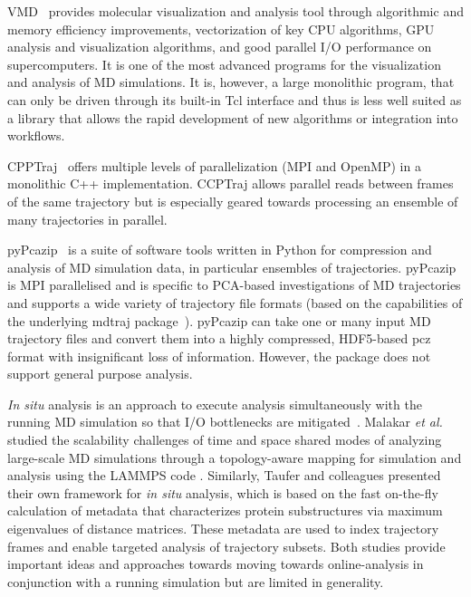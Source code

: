 VMD~\cite{Hum96, VMD2013} provides molecular visualization and analysis tool through algorithmic and memory efficiency improvements, vectorization of key CPU algorithms, GPU analysis and visualization algorithms, and good parallel I/O performance on supercomputers. It is one of the most advanced programs for the visualization and analysis of MD simulations. It is, however, a large monolithic program, that can only be driven through its built-in Tcl interface and thus is less well suited as a library that allows the rapid development of new algorithms or integration into workflows.

CPPTraj~\cite{cpptraj-2013} offers multiple levels of parallelization (MPI and OpenMP) in a monolithic C++ implementation.
CCPTraj allows parallel reads between frames of the same trajectory but is especially geared towards processing an ensemble of many trajectories in parallel.

pyPcazip~\cite{pyPcazip} is a suite of software tools written in Python for compression and analysis of MD simulation data, in particular ensembles of trajectories. 
pyPcazip is MPI parallelised and is specific to PCA-based investigations of MD trajectories and supports a wide variety of trajectory file formats (based on the capabilities of the underlying mdtraj package~\cite{mdtraj-2015}).
pyPcazip can take one or many input MD trajectory files and convert them into a highly compressed, HDF5-based pcz format with insignificant loss of information.
However, the package does not support general purpose analysis.

\textit{In situ} analysis is an approach to execute analysis simultaneously with the running MD simulation so that I/O bottlenecks are  mitigated~\cite{Malakar-etal, Johnston:2017aa}.
Malakar \textit{et al.} studied the scalability challenges of time and space shared modes of analyzing large-scale MD simulations through a topology-aware mapping for simulation and analysis using the LAMMPS code \cite{Malakar-etal}.
Similarly, Taufer and colleagues \cite{Johnston:2017aa} presented their own framework for \textit{in situ} analysis, which is based on the fast on-the-fly calculation of metadata that characterizes protein substructures via maximum eigenvalues of distance matrices.
These metadata are used to index trajectory frames and enable targeted analysis of trajectory subsets.
Both studies provide important ideas and approaches towards moving towards online-analysis in conjunction with a running simulation but are limited in generality.

